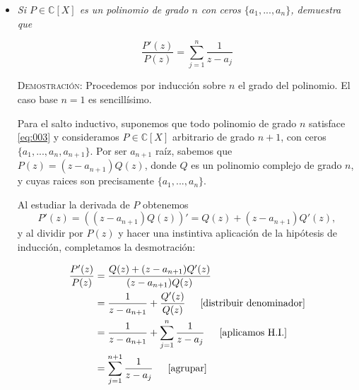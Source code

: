 \documentclass{article}
\begin{document}
\begin{itemize}
    \begin{equation}
        (1 - r)\sum_{n=0}^{N-1} r^n|A_n - A| < \varepsilon/2,
        \label{eq:002}
    \end{equation}

    siempre que $1 - \delta < r < 1$. Para finalizar, unificamos \eqref{eq:001} y \eqref{eq:002} para concluir que

    \[(1 - r)\sum_{n=0}^{\infty} r^n|A_n - A| = (1 - r)\sum_{n=0}^{N-1} r^n|A_n - A| + (1 - r)\sum_{n=N}^{\infty} r^n|A_n - A| < \varepsilon,\]

    si $1 - \delta < r < 1$. \hfill{\textsc{Q.e.d.}}

    \vspace{12px}

    \item \textit{Si $P \in \mathbb{C}[X]$ es un polinomio de grado $n$ con ceros $\{a_1, ..., a_n\}$, demuestra que}
    
    \begin{equation}
        \frac{P'(z)}{P(z)} = \sum_{j=1}^{n} \frac{1}{z - a_j}
        \label{eq:003}
    \end{equation}

    \vspace{5px}

    \textsc{Demostración}: Procedemos por inducción sobre $n$ el grado del polinomio. El caso base $n = 1$ es sencillísimo. 
    
    Para el salto inductivo, suponemos que todo polinomio de grado $n$ satisface \eqref{eq:003} y consideramos $P \in \mathbb{C}[X]$ arbitrario de grado $n + 1$, con ceros $\{a_1, ..., a_n, a_{n+1}\}$. Por ser $a_{n+1}$ raíz, sabemos que $P(z) = (z - a_{n+1})Q(z)$, donde $Q$ es un polinomio complejo de grado $n$, y cuyas raices son precisamente $\{a_1, ..., a_n\}$.

    Al estudiar la derivada de $P$ obtenemos \[P'(z) = ((z - a_{n+1})Q(z))' = Q(z) + (z - a_{n+1})Q'(z),\] y al dividir por $P(z)$ y hacer una instintiva aplicación de la hipótesis de inducción, completamos la desmotración:

    \begin{equation*}
        \begin{split}
            \frac{P'(z)}{P(z)} &= \frac{Q(z) + (z - a_{n+1})Q'(z)}{(z - a_{n+1})Q(z)} \\
            &= \frac{1}{z - a_{n+1}} + \frac{Q'(z)}{Q(z)} \hspace{15px} \text{[distribuir denominador]} \\
            &= \frac{1}{z - a_{n+1}} + \sum_{j=1}^{n} \frac{1}{z - a_j} \hspace{15px} \text{[aplicamos H.I.]} \\
            &= \sum_{j=1}^{n+1} \frac{1}{z - a_j} \hspace{15px} \text{[agrupar]}
        \end{split}
    \end{equation*}


\end{itemize}
\end{document}
